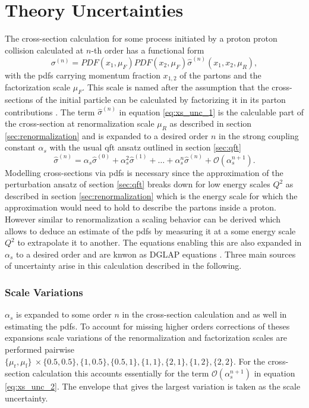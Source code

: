 \section{Theory Uncertainties}
The cross-section calculation for some process initiated by a proton proton collision calculated at $n$-th order has a functional form \citep{unc_recipe}
\begin{equation}
    \sigma^{(n)} = PDF(x_1, \mu_F)  PDF(x_2, \mu_F) \hat{\sigma}^{(n)}(x_1,x_2,\mu_R),
    \label{eq:xs_unc_1}
\end{equation}
with the \acfp{pdf} carrying momentum fraction $x_{1,2}$ of the partons and the factorization scale $\mu_F$. This scale is named after the assumption that the cross-sections of the initial particle can be calculated by factorizing it in its parton contributions \citep{halzen1984introductory}. The term $\hat{\sigma}^{(n)}$ in equation \ref{eq:xs_unc_1} is the calculable part of the cross-section at renormalization scale $\mu_R$ as described in section \ref{sec:renormalization} and is expanded to a desired order $n$ in the strong coupling constant $\alpha_s$ with the usual \ac{qft} ansatz outlined in section \ref{sec:qft}
\begin{equation}
    \hat{\sigma}^{(n)} = \alpha_s \hat{\sigma}^{(0)} + \alpha_s^2 \hat{\sigma}^{(1)} + \ldots + \alpha_s^n \hat{\sigma}^{(n)} + \mathcal{O}(\alpha_s^{n+1}).
    \label{eq:xs_unc_2}
\end{equation}
Modelling cross-sections via \acp{pdf} is necessary since the approximation of the perturbation ansatz of section \ref{sec:qft} breaks down for low energy scales $Q^2$ as described in section \ref{sec:renormalization} which is the energy scale for which the approximation would need to hold to describe the partons inside a proton. However similar to renormalization a scaling behavior can be derived which allows to deduce an estimate of the \acp{pdf} by measuring it at a some energy scale $Q^2$ to extrapolate it to another. The equations enabling this are also expanded in $\alpha_s$ to a desired order and are knwon as DGLAP equations \citep{halzen1984introductory}. Three main sources of uncertainty arise in this calculation described in the following.

\subsubsection*{Scale Variations}
$\alpha_s$ is expanded to some order $n$ in the cross-section calculation and as well in estimating the \acp{pdf}. To account for missing higher orders corrections of theses expansions scale variations of the renormalization and factorization scales are performed pairwise $\{\mu_\text{r},\mu_\text{f}\}\ \times \{0.5,0.5\}, \{1,0.5\}, \{0.5,1\}, \{1,1\}, \{2,1\}, \{1,2\}, \{2,2\}$. For the cross-section calculation this accounts essentially for the term $\mathcal{O}(\alpha_s^{n+1})$ in equation \ref{eq:xs_unc_2}. The envelope that gives the largest variation is taken as the scale uncertainty.

